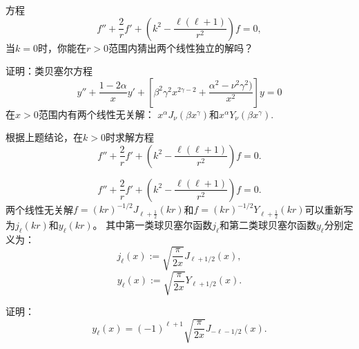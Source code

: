 \documentclass[CJK]{beamer}
\begin{document}
\begin{frame}
  \bch
  
  方程
  $$ f''+\frac{2}{r}f'+\left(k^2-\frac{\ell(\ell+1)}{r^2}\right) f = 0, $$
  当$k=0$时，你能在$r>0$范围内猜出两个线性独立的解吗？

  \ech
\end{frame}


\begin{frame}
  \bch
  
  证明：类贝塞尔方程
  $$ y''+\frac{1-2\alpha}{x} y' + \left[\beta^2\gamma^2x^{2\gamma-2}+\frac{\alpha^2-\nu^2\gamma^2)}{x^2}\right]y=0 $$
  在$x>0$范围内有两个线性无关解： $x^{\alpha}J_\nu(\beta x^\gamma)$和$x^{\alpha}Y_\nu(\beta x^\gamma)$.
  \ech
\end{frame}


\begin{frame}
  \bch

  根据上题结论，在$k>0$时求解方程
  $$ f''+\frac{2}{r}f'+\left(k^2-\frac{\ell(\ell+1)}{r^2}\right) f = 0. $$
  \ech
\end{frame}

\begin{frame}
  \bch
  $$ f''+\frac{2}{r}f'+\left(k^2-\frac{\ell(\ell+1)}{r^2}\right) f = 0. $$  
  两个线性无关解$f =  (kr)^{-1/2}J_{\ell+\frac{1}{2}}(kr)$和$f=(kr)^{-1/2}Y_{\ell+\frac{1}{2}}(kr)$可以重新写为$ j_\ell(kr)$和$y_{\ell}(kr)$。
  其中第一类球贝塞尔函数$j_\ell$和第二类球贝塞尔函数$y_\ell$分别定义为：{\blue
  $$ j_\ell(x) :=\sqrt{ \frac{\pi}{2x}} J_{\ell+1/2}(x), $$
  $$ y_\ell(x) :=\sqrt{ \frac{\pi}{2x}} Y_{\ell+1/2}(x). $$  }

  
  \ech
\end{frame}


\begin{frame}
  \bch
  \ech
\end{frame}


\begin{frame}
  \bch
  \ech
\end{frame}

\begin{frame}
  \bch
  
  证明：
  $$y_\ell(x) = (-1)^{\ell+1}\sqrt{\frac{\pi}{2x}}J_{-\ell-1/2}(x).$$
  \ech
\end{frame}
\end{document}
